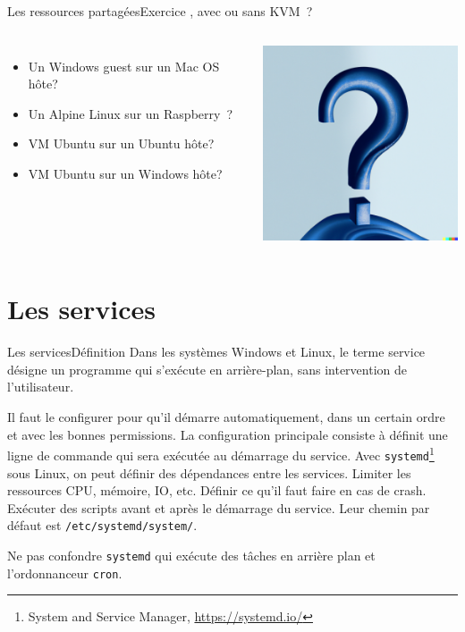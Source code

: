 \documentclass{beamer}
\begin{document}
    \begin{frame}{Les ressources partagées}{Exercice \execcounterdispinc{}, avec ou sans KVM~?}
        \begin{columns}
            \begin{itemize}
                \item Un Windows guest sur un Mac OS hôte?
                \item Un Alpine Linux sur un Raspberry\footnotemark~?
                \item VM Ubuntu sur un Ubuntu hôte?
                \item VM Ubuntu sur un Windows hôte?
            \end{itemize}
            \centering
            \includegraphics[width=6cm]{image/question-mark-on-a-blank-background}
        \end{columns}
    \end{frame}


    \section{Les services}\label{sec:les-services}

    \begin{frame}{Les services}{Définition}
        Dans les systèmes Windows et Linux, le terme service désigne un programme qui s'exécute en arrière-plan, sans intervention de l'utilisateur.

        Il faut le configurer pour qu'il démarre automatiquement, dans un certain ordre et avec les bonnes permissions.
        \bigbreak
        La configuration principale consiste à définit une ligne de commande qui sera exécutée au démarrage du service.
        \bigbreak
        Avec \lstinline{systemd}\footnote{System and Service Manager, \url{https://systemd.io/}} sous Linux, on peut définir des dépendances entre les services.
        Limiter les ressources CPU, mémoire, IO, etc.
        Définir ce qu'il faut faire en cas de crash.
        Exécuter des scripts avant et après le démarrage du service.
        \bigbreak
        Leur chemin par défaut est \lstinline{/etc/systemd/system/}.
        \begin{dangercolorbox}
            Ne pas confondre \lstinline{systemd} qui exécute des tâches en arrière plan et l'ordonnanceur \lstinline{cron}.
        \end{dangercolorbox}
    \end{frame}
\end{document}
